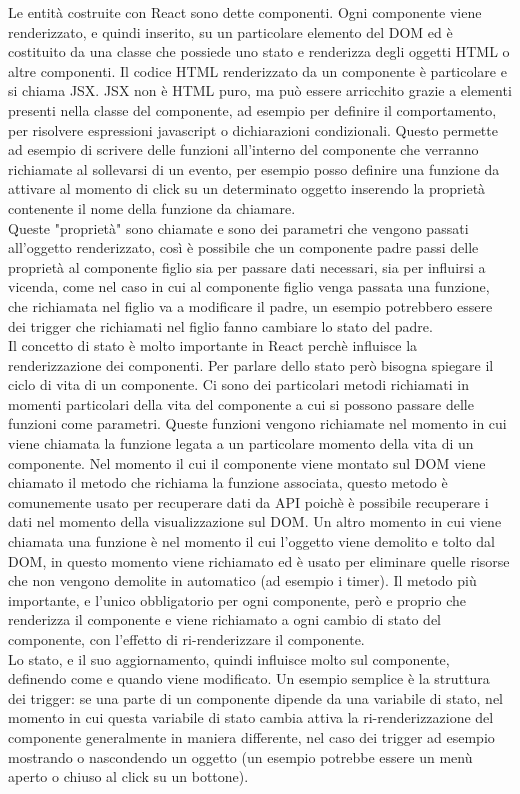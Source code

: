 \noindent
Le entità costruite con React sono dette componenti. Ogni componente viene renderizzato, e quindi inserito, su un particolare elemento del DOM ed è costituito da una classe che possiede uno stato e renderizza degli oggetti HTML o altre componenti. Il codice HTML renderizzato da un componente è particolare e si chiama JSX. JSX non è HTML puro, ma può essere arricchito grazie a elementi presenti nella classe del componente, ad esempio per definire il comportamento, per risolvere espressioni javascript o dichiarazioni condizionali. Questo permette ad esempio di scrivere delle funzioni all'interno del componente che verranno richiamate al sollevarsi di un evento, per esempio posso definire una funzione da attivare al momento di click su un determinato oggetto inserendo la proprietà  contenente il nome della funzione da chiamare.\\
Queste "proprietà" sono chiamate  e sono dei parametri che vengono passati all'oggetto renderizzato, così è possibile che un componente padre passi delle proprietà al componente figlio sia per passare dati necessari, sia per influirsi a vicenda, come nel caso in cui al componente figlio venga passata una funzione, che richiamata nel figlio va a modificare il padre, un esempio potrebbero essere dei trigger che richiamati nel figlio fanno cambiare lo stato del padre.\\
Il concetto di stato è molto importante in React perchè influisce la renderizzazione dei componenti. Per parlare dello stato però bisogna spiegare il ciclo di vita di un componente. Ci sono dei particolari metodi richiamati in momenti particolari della vita del componente a cui si possono passare delle funzioni come parametri. Queste funzioni vengono richiamate nel momento in cui viene chiamata la funzione legata a un particolare momento della vita di un componente. Nel momento il cui il componente viene montato sul DOM viene chiamato il metodo  che richiama la funzione associata, questo metodo è comunemente usato per recuperare dati da API poichè è possibile recuperare i dati nel momento della visualizzazione sul DOM. Un altro momento in cui viene chiamata una funzione è nel momento il cui l'oggetto viene demolito e tolto dal DOM, in questo momento viene richiamato  ed è usato per eliminare quelle risorse che non vengono demolite in automatico (ad esempio i timer). Il metodo più importante, e l'unico obbligatorio per ogni componente, però e proprio  che renderizza il componente e viene richiamato a ogni cambio di stato del componente, con l'effetto di ri-renderizzare il componente.\\
Lo stato, e il suo aggiornamento, quindi influisce molto sul componente, definendo come e quando viene modificato. Un esempio semplice è la struttura dei trigger: se una parte di un componente dipende da una variabile di stato, nel momento in cui questa variabile di stato cambia attiva la ri-renderizzazione del componente generalmente in maniera differente, nel caso dei trigger ad esempio mostrando o nascondendo un oggetto (un esempio potrebbe essere un menù aperto o chiuso al click su un bottone).\\

